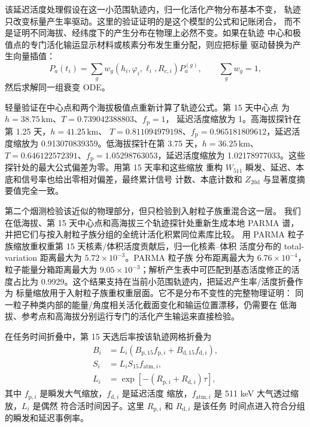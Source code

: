 \documentclass[preprint,12pt]{elsarticle}
\newcommand{\wii}{W_{511}}
\begin{document}
该延迟活度处理假设在这一小范围轨迹内，归一化活化产物分布基本不变，
轨迹只改变标量产生率驱动。这里的验证证明的是这个模型的公式和记账闭合，
而不是证明不同海拔、经纬度下的产生分布在物理上必然不变。如果在轨迹
中心和极值点的专门活化输运显示材料或核素分布发生重分配，则应把标量
驱动替换为产生向量插值：
\begin{equation}
  P_a(t_i)=\sum_g w_g(h_i,\varphi_i,\ell_i,R_{c,i})P_a^{(g)},\qquad
  \sum_g w_g=1,
\end{equation}
然后求解同一组衰变 ODE。

轻量验证在中心点和两个海拔极值点重新计算了轨迹公式。第 15 天中心点
为 $h=38.75\,\mathrm{km}$、$T=0.739042388803$、$f_{\mathrm{p}}=1$，
延迟活度缩放为 1。高海拔探针在第 1.25 天，$h=41.25\,\mathrm{km}$、
$T=0.811094979198$、$f_{\mathrm{p}}=0.965181809612$，延迟活度缩放为
0.913070839359。低海拔探针在第 3.75 天，$h=36.25\,\mathrm{km}$、
$T=0.646122572391$、$f_{\mathrm{p}}=1.05298763053$，延迟活度缩放为
1.02178977033。这些探针处的最大公式偏差为零。用第 15 天率和这些缩放
重构 $\wii$ 瞬发、延迟、本底和信号率也给出零相对偏差，最终累计信号
计数、本底计数和 $Z_{20\mathrm{d}}$ 与显著度摘要值完全一致。

第二个烟测检验该近似的物理部分，但只检验到入射粒子族重混合这一层。
我们在低海拔、第 15 天中心点和高海拔三个轨迹探针处重新生成本地
PARMA 谱，并把它们与按入射粒子族分组的全统计活化积累同位素库比较。
用 PARMA 粒子族缩放重权重第 15 天核素/体积活度贡献后，归一化核素--体积
活度分布的 total-variation 距离最大为 $5.72\times10^{-3}$。PARMA 粒子族
分布距离最大为 $6.76\times10^{-4}$，粒子能量分箱距离最大为
$9.05\times10^{-3}$；解析产生表中可匹配到基态活度修正的活度占比为
0.9929。这个结果支持在当前小范围轨迹内，把延迟产生率/活度折叠作为
标量缩放用于入射粒子族重权重层面。它不是分布不变性的完整物理证明：
同一粒子种类内部的能量/角度相关活化截面变化和输运位置漂移，仍需要在
低海拔、参考点和高海拔分别运行专门的活化产生输运来直接检验。

在任务时间折叠中，第 15 天选后率按该轨迹网格折叠为
\begin{align}
  B_i &= L_i\left(B_{\mathrm{p},15} f_{\mathrm{p},i}
        + B_{\mathrm{d},15} f_{\mathrm{d},i}\right),\\
  S_i &= L_i S_{15} f_{\mathrm{atm},i},\\
  L_i &= \exp[-(R_{\mathrm{p},i}+R_{\mathrm{d},i})\tau],
\end{align}
其中 $f_{\mathrm{p},i}$ 是瞬发大气缩放，$f_{\mathrm{d},i}$ 是延迟活度
缩放，$f_{\mathrm{atm},i}$ 是 511 keV 大气透过缩放，$L_i$ 是偶然
符合活时间因子。这里 $R_{\mathrm{p},i}$ 和 $R_{\mathrm{d},i}$ 是该任务
时间点进入符合分组的瞬发和延迟事例率。
\end{document}
